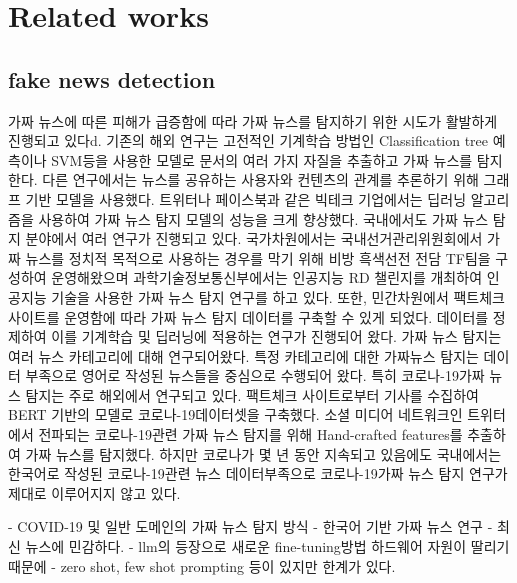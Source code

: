 \documentclass[a4paper,fleqn]{cas-sc}
\begin{document}

\section{Related works}
\subsection{fake news detection}
가짜 뉴스에 따른 피해가 급증함에 따라 가짜 뉴스를 탐지하기 위한 시도가 활발하게 진행되고 있다d. 
기존의 해외 연구는 고전적인 기계학습 방법인 Classification tree 예측이나 SVM등을 사용한 모델로 문서의 여러 가지 자질을 추출하고 가짜 뉴스를 탐지한다. 
다른 연구에서는 뉴스를 공유하는 사용자와 컨텐츠의 관계를 추론하기 위해 그래프 기반 모델을 사용했다. 트위터나 페이스북과 같은 빅테크 기업에서는 딥러닝 알고리즘을 사용하여 가짜 뉴스 탐지 모델의 성능을 크게 향상했다. 
국내에서도 가짜 뉴스 탐지 분야에서 여러 연구가 진행되고 있다. 
국가차원에서는 국내선거관리위원회에서 가짜 뉴스를 정치적 목적으로 사용하는 경우를 막기 위해 비방 흑색선전 전담 TF팀을 구성하여 운영해왔으며 과학기술정보통신부에서는 인공지능 RD 챌린지를 개최하여 인공지능 기술을 사용한 가짜 뉴스 탐지 연구를 하고 있다. 
또한, 민간차원에서 팩트체크 사이트를 운영함에 따라 가짜 뉴스 탐지 데이터를 구축할 수 있게 되었다. 
데이터를 정제하여 이를 기계학습 및 딥러닝에 적용하는 연구가 진행되어 왔다.
가짜 뉴스 탐지는 여러 뉴스 카테고리에 대해 연구되어왔다. 
특정 카테고리에 대한 가짜뉴스 탐지는 데이터 부족으로 영어로 작성된 뉴스들을 중심으로 수행되어 왔다. 특히 코로나-19가짜 뉴스 탐지는 주로 해외에서 연구되고 있다. 팩트체크 사이트로부터 기사를 수집하여 BERT 기반의 모델로 코로나-19데이터셋을 구축했다. 소셜 미디어 네트워크인 트위터에서 전파되는 코로나-19관련 가짜 뉴스 탐지를 위해 Hand-crafted features를 추출하여 가짜 뉴스를 탐지했다. 하지만 코로나가 몇 년 동안 지속되고 있음에도 국내에서는 한국어로 작성된 코로나-19관련 뉴스 데이터부족으로 코로나-19가짜 뉴스 탐지 연구가 제대로 이루어지지 않고 있다.

- COVID-19 및 일반 도메인의 가짜 뉴스 탐지 방식
- 한국어 기반 가짜 뉴스 연구
- 최신 뉴스에 민감하다.
- llm의 등장으로 새로운 fine-tuning방법 하드웨어 자원이 딸리기 때문에
- zero shot, few shot prompting 등이 있지만 한계가 있다.
\end{document}
